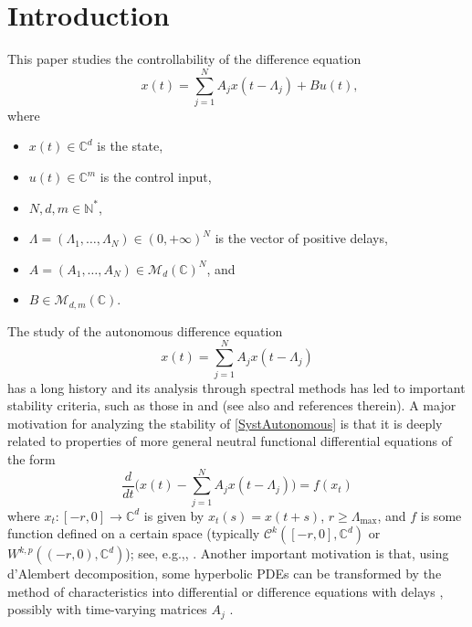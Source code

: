 \documentclass[10pt]{amsart}
\providecommand{\eg}{}
\renewcommand{\eg}{e.g.,\xspace}
\theoremstyle{plain}
\theoremstyle{definition}
\begin{document}
\section{Introduction}
\label{SecIntro}

This paper studies the controllability of the difference equation\vspace*{-3pt}
\begin{equation}
\label{MainSyst}
\qquad x(t) = \sum_{j=1}^N A_j x(t - \Lambda_j) + B u(t),
\end{equation}
where
\begin{itemize}
\item
$x(t) \in \mathbb C^d$ is the state,
\item
$u(t) \in \mathbb C^m$ is the control input,
\item
$N, d, m \in \mathbb N^\ast$,
\item
$\Lambda = (\Lambda_1, \dots, \Lambda_N) \in (0, +\infty)^N$ is the vector of positive delays,
\item
$A = (A_1, \dots, A_N) \in \mathcal M_d(\mathbb C)^N$, and
\item
$B \in \mathcal M_{d, m}(\mathbb C)$.
\end{itemize}

The study of the autonomous difference equation\vspace*{-3pt}
\begin{equation}
\label{SystAutonomous}
x(t) = \sum_{j=1}^N A_j x(t - \Lambda_j)
\end{equation}
has a long history and its analysis through spectral methods has led to important stability criteria, such as those in \cite{Avellar1980Zeros} and \cite[Chap.\,9]{Hale1993Introduction} (see also \cite{Melvin1974Stability, Cruz1970Stability, Henry1974Linear, Datko1977Linear, Hale1985Stability, Michiels2009Strong} and references therein). A major motivation for analyzing the stability of \eqref{SystAutonomous} is that it is deeply related to properties of more general neutral functional differential equations of the form\vspace*{-3pt}
\begin{equation}
\label{NFDE}
\frac{d}{dt}\biggl(x(t) - \sum_{j=1}^N A_j x(t - \Lambda_j)\biggr) = f(x_t)
\end{equation}
where $x_t: [-r, 0] \to \mathbb C^d$ is given by $x_t(s) = x(t + s)$, $r \geq \Lambda_{\max}$, and $f$ is some function defined on a certain space (typically $\mathcal C^k([-r, 0], \mathbb C^d)$ or $W^{k, p}((-r, 0), \mathbb C^d)$); see, \eg \cite{Cruz1970Stability, Datko1977Linear, Hale1985Stability, Ngoc2015Exponential}, \cite[\S 9.7]{Hale1993Introduction}. Another important motivation is that, using d'Alembert decomposition, some hyperbolic PDEs can be transformed by the method of characteristics into differential or difference equations with delays \cite{Coron2015Dissipative, Coron2008Dissipative, Cooke1968Differential, Fridman2010Bounds, Slemrod1971Nonexistence, Kloss2012Flow}, possibly with time-varying matrices $A_j$ \cite{Chitour2017Persistently, Chitour2016Stability}.
\end{document}

